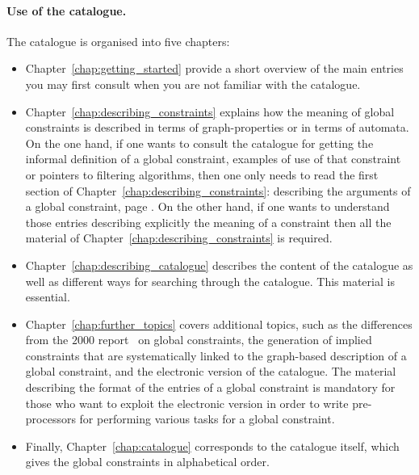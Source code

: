 \paragraph{Use of the catalogue.}
The catalogue is organised into five chapters:
\begin{itemize}
\item
Chapter~\ref{chap:getting_started} provide a short overview of the main entries you may first consult when you are not familiar with the catalogue.

\item
Chapter~\ref{chap:describing_constraints} explains how the meaning of global constraints is described in terms of graph\nobreakdash-properties or in terms of automata. On the one hand, if one wants to consult the catalogue for getting the informal definition of a global constraint, examples of use of that constraint or pointers to filtering algorithms, then one only needs to read the first section of Chapter~\ref{chap:describing_constraints}: describing the arguments of a global constraint, page \pageref{sec:arguments}. On the other hand, if one wants to understand those entries describing explicitly the meaning of a constraint then all the material of Chapter~\ref{chap:describing_constraints} is required.

\item
Chapter~\ref{chap:describing_catalogue} describes the content of the catalogue as well as different ways for searching through the catalogue. This material is essential.

\item
Chapter~\ref{chap:further_topics} covers additional topics, such as the differences from the $2000$ report~\cite{BeldiceanuR00} on global constraints, the generation of implied constraints that are systematically linked to the graph\nobreakdash-based description of a global constraint, and the electronic version of the catalogue. The material describing the format of the entries of a global constraint is mandatory for those who want to exploit the electronic version in order to write pre\nobreakdash-processors for performing various tasks for a global constraint. 

\item
Finally, Chapter~\ref{chap:catalogue} corresponds to the catalogue itself, which gives the global constraints in alphabetical order.\\
\end{itemize}

\mainmatter
